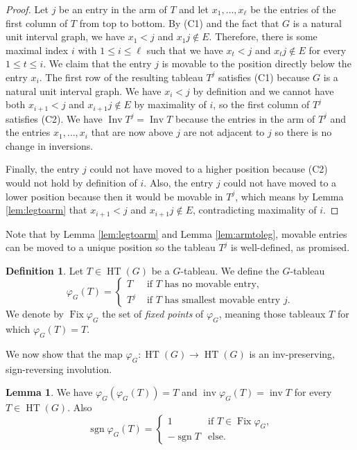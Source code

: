 \documentclass[10pt,a4paper]{amsart}
\theoremstyle{definition}
\newtheorem{lemma}[theorem]{Lemma}
\newtheorem{definition}[theorem]{Definition}
\theoremstyle{remark}
\numberwithin{equation}{section}
\DeclareMathOperator{\Inv}{Inv}
\DeclareMathOperator{\inv}{inv}
\DeclareMathOperator{\Fix}{Fix}
\DeclareMathOperator{\HT}{HT}
\DeclareMathOperator{\sgn}{sgn}
\begin{document}
\begin{proof}
Let $j$ be an entry in the arm of $T$ and let $x_1,\ldots,x_\ell$ be the entries of the first column of $T$ from top to bottom. By (C1) and the fact that $G$ is a natural unit interval graph, we have $x_1<j$ and $x_1j\notin E$. Therefore, there is some maximal index $i$ with $1\leq i\leq \ell$ such that we have $x_t<j$ and $x_tj\notin E$ for every $1\leq t\leq i$. We claim that the entry $j$ is movable to the position directly below the entry $x_i$. The first row of the resulting tableau $T^j$ satisfies (C1) because $G$ is a natural unit interval graph. We have $x_i<j$ by definition and we cannot have both $x_{i+1}<j$ and $x_{i+1}j\notin E$ by maximality of $i$, so the first column of $T^j$ satisfies (C2). We have $\Inv T^j=\Inv T$ because the entries in the arm of $T^j$ and the entries $x_1,\ldots,x_i$ that are now above $j$ are not adjacent to $j$ so there is no change in inversions. 

Finally, the entry $j$ could not have moved to a higher position because (C2) would not hold by definition of $i$. Also, the entry $j$ could not have moved to a lower position because then it would be movable in $T^j$, which means by Lemma \ref{lem:legtoarm} that $x_{i+1}<j$ and $x_{i+1}j\notin E$, contradicting maximality of $i$.
\end{proof}

Note that by Lemma \ref{lem:legtoarm} and Lemma \ref{lem:armtoleg}, movable entries can be moved to a unique position so the tableau $T^j$ is well-defined, as promised.

\begin{definition}
Let $T\in\HT(G)$ be a $G$-tableau. We define the $G$-tableau
\begin{equation}
\varphi_G(T)=\begin{cases} T&\text{ if }T\text{ has no movable entry,}\\ T^j&\text{ if }T\text{ has smallest movable entry }j.\end{cases}
\end{equation}
We denote by $\Fix\varphi_G$ the set of \emph{fixed points} of $\varphi_G$, meaning those tableaux $T$ for which $\varphi_G(T)=T$.
\end{definition}

We now show that the map $\varphi_G:\HT(G)\to\HT(G)$ is an inv-preserving, sign-reversing involution.

\begin{lemma}\label{lem:signrev}
We have $\varphi_G(\varphi_G(T))=T$ and $\inv \varphi_G(T)=\inv T$ for every $T\in\HT(G)$. Also
$$
\sgn \varphi_G(T) =
\begin{cases}
1   & \text{if $T\in\Fix\varphi_G$,}\\
-\sgn T & \text{else.}
\end{cases}
$$
\end{lemma}
\end{document}
